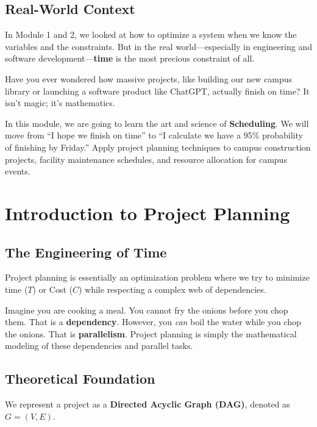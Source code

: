 \documentclass[
  letterpaper,
  DIV=11,
  numbers=noendperiod]{scrreprt}
\begin{document}
\subsection{Real-World Context}\label{real-world-context-1}

In Module 1 and 2, we looked at how to optimize a system when we know
the variables and the constraints. But in the real world---especially in
engineering and software development---\textbf{time} is the most
precious constraint of all.

Have you ever wondered how massive projects, like building our new
campus library or launching a software product like ChatGPT, actually
finish on time? It isn't magic; it's mathematics.

In this module, we are going to learn the art and science of
\textbf{Scheduling}. We will move from ``I hope we finish on time'' to
``I calculate we have a 95\% probability of finishing by Friday.'' Apply
project planning techniques to campus construction projects, facility
maintenance schedules, and resource allocation for campus events.

\section{Introduction to Project
Planning}\label{introduction-to-project-planning}

\subsection{The Engineering of Time}\label{the-engineering-of-time}

Project planning is essentially an optimization problem where we try to
minimize time (\(T\)) or Cost (\(C\)) while respecting a complex web of
dependencies.

Imagine you are cooking a meal. You cannot fry the onions before you
chop them. That is a \textbf{dependency}. However, you \emph{can} boil
the water while you chop the onions. That is \textbf{parallelism}.
Project planning is simply the mathematical modeling of these
dependencies and parallel tasks.

\subsection{Theoretical Foundation}\label{theoretical-foundation-4}

We represent a project as a \textbf{Directed Acyclic Graph (DAG)},
denoted as \(G = (V, E)\).
\end{document}
